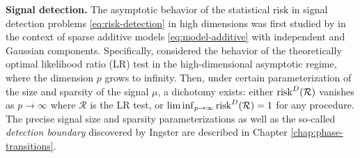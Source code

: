 

\medskip
{\bf Signal detection.}
The asymptotic behavior of the statistical risk in signal detection problems \eqref{eq:risk-detection} in high dimensions was first studied by  in the context of sparse additive models \eqref{eq:model-additive} with 
independent and Gaussian components. Specifically, \cite{ingster1998minimax} considered the behavior of the 
theoretically optimal likelihood ratio (\ac{LR}) test in the high-dimensional asymptotic regime, where the dimension $p$ grows to infinity. Then, under certain parameterization of the size and sparsity of the signal $\mu$, a dichotomy exists: 
either ${\rm risk}^D(\mathcal{R})$ vanishes as $p\to\infty$ where $\mathcal{R}$ is the \ac{LR} test, or $\liminf_{p\to\infty} {\rm risk}^D(\mathcal{R}) = 1$ for any procedure.
The precise signal size and sparsity parameterizations as well as the so-called {\em detection boundary} discovered by Ingster are described in Chapter \ref{chap:phase-transitions}.

